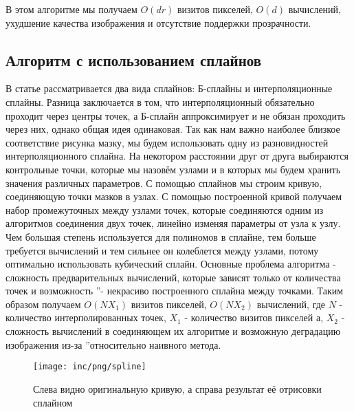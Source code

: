 В этом алгоритме мы получаем $O(dr)$ визитов пикселей, $O(d)$ вычислений, ухудшение качества изображения и отсутствие поддержки прозрачности.


\subsection{Алгоритм с использованием сплайнов}
В статье \cite{cgim02} рассматривается два вида сплайнов: Б-сплайны и интерполяционные сплайны. Разница заключается в том, что интерполяционный обязательно проходит через центры точек, а Б-сплайн аппроксимирует и не обязан проходить через них, однако общая идея одинаковая. Так как нам важно наиболее близкое соответствие рисунка мазку, мы будем использовать одну из разновидностей интерполяционного сплайна. На некотором расстоянии друг от друга выбираются контрольные точки, которые мы назовём узлами и в которых мы будем хранить значения различных параметров. С помощью сплайнов мы строим кривую, соединяющую точки мазков в узлах. С помощью построенной кривой получаем набор промежуточных между узлами точек, которые соединяются одним из алгоритмов соединения двух точек, линейно изменяя параметры от узла к узлу. Чем большая степень используется для полиномов в сплайне, тем больше требуется вычислений и тем сильнее он колеблется между узлами, потому оптимально использовать кубический сплайн. \cite{aspline70} Основные проблема алгоритма - сложность предварительных вычислений, которые зависят только от количества точек и возможность \textquotedblright - некрасиво построенного сплайна между точками.  Таким образом получаем  $O(NX_1)$ визитов пикселей, $O(NX_2)$ вычислений, где $N$ - количество интерполированных точек, $X_1$ - количество визитов пикселей а, $X_2$ - сложность вычислений в соединяющем их алгоритме и возможную деградацию изображения из-за \textquotedblright относительно наивного метода. \cite{cgim02}\\ 

\begin{figure}
	[ht]
	\centering
	\texttt{[image: inc/png/spline]}
	\caption{Слева видно оригинальную кривую, а справа результат её отрисовки сплайном}
	\label{fig:fig06}
\end{figure}

